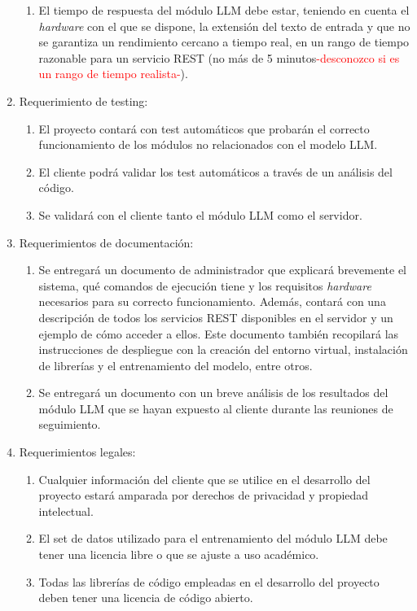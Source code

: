 \documentclass[
11pt, %
]{Clases/charter}
\begin{document}
\begin{enumerate}
\begin{enumerate}
		      \item El tiempo de respuesta del módulo LLM debe estar, teniendo en cuenta el \textit{hardware} con el que se dispone, la extensión del texto de entrada y que no se garantiza un rendimiento cercano a tiempo real,
		            en un rango de tiempo razonable para un servicio REST (no más de 5 minutos\textcolor{red}{-desconozco si es un rango de tiempo realista-}).
	      \end{enumerate}
	\item Requerimiento de testing:
	      \begin{enumerate}
		      \item El proyecto contará con test automáticos que probarán el correcto funcionamiento de los módulos no relacionados con el modelo LLM.
		      \item El cliente podrá validar los test automáticos a través de un análisis del código.
		      \item Se validará con el cliente tanto el módulo LLM como el servidor.
	      \end{enumerate}
	\item Requerimientos de documentación:
	      \begin{enumerate}
		      \item Se entregará un documento de administrador que explicará brevemente el sistema, qué comandos de ejecución tiene y los requisitos \textit{hardware} necesarios para su correcto funcionamiento.
		            Además, contará con una descripción de todos los servicios REST disponibles en el servidor y un ejemplo de cómo acceder a ellos.
		            Este documento también recopilará las instrucciones de despliegue con la creación del entorno virtual, instalación de librerías y el entrenamiento del modelo, entre otros.
		      \item Se entregará un documento con un breve análisis de los resultados del módulo LLM que se hayan expuesto al cliente durante las reuniones de seguimiento.
	      \end{enumerate}
	\item Requerimientos legales:
	      \begin{enumerate}
		      \item Cualquier información del cliente que se utilice en el desarrollo del proyecto estará amparada por derechos de privacidad y propiedad intelectual.
		      \item El set de datos utilizado para el entrenamiento del módulo LLM debe tener una licencia libre o que se ajuste a uso académico.
		      \item Todas las librerías de código empleadas en el desarrollo del proyecto deben tener una licencia de código abierto.
	      \end{enumerate}
\end{enumerate}
\end{document}
